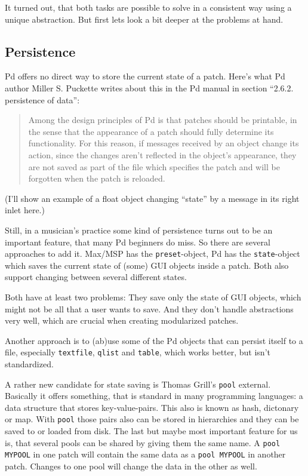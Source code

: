 \documentclass[10pt,english]{scrartcl}
\begin{document}
It turned out, that both tasks are possible to solve in a consistent way
using a unique abstraction. But first lets look a bit deeper at the
problems at hand.



\hypertarget{persistence}{}
\subsection*{Persistence}

Pd offers no direct way to store the current state of a patch. Here's what
Pd author Miller S. Puckette writes about this in the Pd manual in section
``2.6.2.  persistence of data'':
\begin{quote}

Among the design principles of Pd is that patches should be printable,
in the sense that the appearance of a patch should fully determine its
functionality. For this reason, if messages received by an object
change its action, since the changes aren't reflected in the object's
appearance, they are not saved as part of the file which specifies the
patch and will be forgotten when the patch is reloaded.
\end{quote}

(I'll show an example of a float object changing ``state'' by a message in
its right inlet here.)

Still, in a musician's practice some kind of persistence turns out to be an
important feature, that many Pd beginners do miss. So there are several
approaches to add it. Max/MSP has the \texttt{preset}-object, Pd has the
\texttt{state}-object which saves the current state of (some) GUI objects inside
a patch. Both also support changing between several different states.

Both have at least two problems: They save only the state of GUI objects,
which might not be all that a user wants to save. And they don't handle
abstractions very well, which are crucial when creating modularized
patches.

Another approach is to (ab)use some of the Pd objects that can persist
itself to a file, especially \texttt{textfile}, \texttt{qlist} and \texttt{table}, which
works better, but isn't standardized.

A rather new candidate for state saving is Thomas Grill's \texttt{pool}
external. Basically it offers something, that is standard in many
programming languages: a data structure that stores key-value-pairs. This
also is known as hash, dictonary or map. With \texttt{pool} those pairs also can
be stored in hierarchies and they can be saved to or loaded from disk. The
last but maybe most important feature for us is, that several pools can be
shared by giving them the same name. A \texttt{pool MYPOOL} in one patch will
contain the same data as a \texttt{pool MYPOOL} in another patch. Changes to one
pool will change the data in the other as well.
\end{document}
